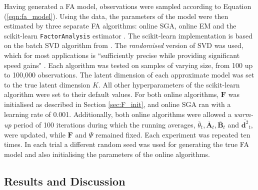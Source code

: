 \documentclass[msc,deptreport.inf]{infthesis} %
\newcommand{\matr}[1]{\mathbf{#1}}
\begin{document}
Having generated a FA model, observations were sampled according to Equation (\ref{eqn:fa_model}). Using the data, the parameters of the model were then estimated by three separate FA algorithms: online SGA, online EM and the scikit-learn \texttt{FactorAnalysis} estimator \cite{pedregosa2012}. The scikit-learn implementation is based on the batch SVD algorithm from \cite{barber2007}. The \emph{randomised} version of SVD was used, which for most applications is  ``sufficiently precise while providing significant speed gains" \cite{pedregosa2012}. Each algorithm was tested on samples of varying size, from 100 up to 100,000 observations. The latent dimension of each approximate model was set to the true latent dimension $K$. All other hyperparameters of the scikit-learn algorithm were set to their default values. For both online algorithms, $\matr{F}$ was initialised as described in Section \ref{sec:F_init}, and online SGA ran with a learning rate of 0.001. Additionally, both online algorithms were allowed a \emph{warm-up} period of 100 iterations during which the running averages, $\overline{\theta}_t, \overline{\matr{A}}_t, \overline{\matr{B}}_t$ and $\overline{\matr{d}^2}_t$, were updated, while $\matr{F}$ and $\Psi$ remained fixed. Each experiment was repeated ten times. In each trial a different random seed was used for generating the true FA model and also initialising the parameters of the online algorithms. 


\subsection{Results and Discussion}
\end{document}
